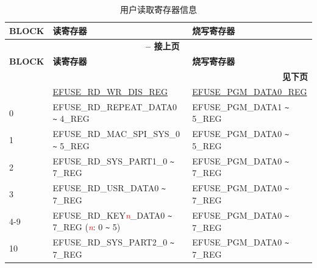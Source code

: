 \begin{longtable}[c]{|l|l|l|}
\caption{用户读取寄存器信息}
\label{tab:efuse-softw-read-para}
    \\\hline
    \rowcolor{lightgray}
        \textbf{BLOCK} & \textbf{读寄存器} & \textbf{烧写寄存器}\\
    \endfirsthead
    
    \multicolumn{3}{c}{\bfseries \tablename\ \thetable{} -- 接上页}\\\hline
    
    \rowcolor{lightgray}
        \textbf{BLOCK} & \textbf{读寄存器} & \textbf{烧写寄存器}\\
    \endhead
    
    \multicolumn{3}{r}{\textbf{见下页}} \\
    \endfoot
    \endlastfoot
    \hline
0 & \hyperref[regdesc:EFUSERDWRDISREG]{EFUSE\_RD\_WR\_DIS\_REG} & \hyperref[regdesc:EFUSEPGMDATA0REG]{EFUSE\_PGM\_DATA0\_REG} \\\hline
0 & EFUSE\_RD\_REPEAT\_DATA0 \verb+~+ 4\_REG & EFUSE\_PGM\_DATA1 \verb+~+ 5\_REG \\\hline
1 & EFUSE\_RD\_MAC\_SPI\_SYS\_0 \verb+~+ 5\_REG & EFUSE\_PGM\_DATA0 \verb+~+ 5\_REG \\\hline
2 & EFUSE\_RD\_SYS\_PART1\_0 \verb+~+ 7\_REG & EFUSE\_PGM\_DATA0 \verb+~+ 7\_REG \\\hline
3 & EFUSE\_RD\_USR\_DATA0 \verb+~+ 7\_REG & EFUSE\_PGM\_DATA0 \verb+~+ 7\_REG \\ \hline
4-9 & EFUSE\_RD\_KEY\textcolor{red}{\it{n}}\_DATA0 \verb+~+ 7\_REG (\textcolor{red}{\it{n}}: 0 \verb+~+ 5) & EFUSE\_PGM\_DATA0 \verb+~+ 7\_REG \\\hline
10 & EFUSE\_RD\_SYS\_PART2\_0 \verb+~+ 7\_REG & EFUSE\_PGM\_DATA0 \verb+~+ 7\_REG \\\hline
\end{longtable}
